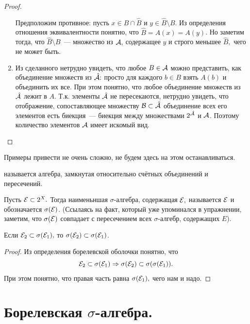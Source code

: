 \documentclass{notes}
\begin{document}
\begin{exc}
\begin{proof}
\begin{enumerate}
				Предположим противное: пусть $x \in B \cap \hat{B}$ и $y \in \hat{B} \setminus B$. Из определения отношения эквивалентности понятно, что $\hat{B} = A(x) = A(y)$. Но заметим тогда, что $\hat{B} \setminus B$~--- множество из $\mathcal{A},$ содержащее $y$ и строго меньшее $\hat{B},$ чего не может быть.
				\item Из сделанного нетрудно увидеть, что любое $B \in \mathcal{A}$ можно представить, как объединение множеств из $\hat{\mathcal{A}}\text{\text{:}}$ просто для каждого $b \in B$ взять $A(b)$ и объединить их все. При этом понятно, что любое объединение множеств из $\hat{\mathcal{A}}$ лежит в $A$. Т.к. элементы $\hat{\mathcal{A}}$ не пересекаются, нетрудно увидеть, что отображение, сопоставляющее множеству $\mathcal{B} \subset \hat{\mathcal{A}}$ объединение всех его элементов есть биекция~--- биекция между множествами $2^{\hat{\mathcal{A}}}$ и $\mathcal{A}$. Поэтому количество элементов $\mathcal{A}$ имеет искомый вид.
			\end{enumerate}
		\end{proof}
	\end{exc}

	Примеры привести не очень сложно, не будем здесь на этом останавливаться.

	\begin{de}
		 называется алгебра, замкнутая относительно счётных объединений и пересечений.
	\end{de}

	\begin{de}
		Пусть $\mathcal{E} \subset 2^X.$ Тогда наименьншая $\sigma$-алгебра, содержащая $\mathcal{E},$ называется  $\mathcal{E}$ и обозначается $\sigma(\mathcal{E})$. (Ссылаясь на факт, который уже упоминался в упражнении, заметим, что $\sigma(\mathcal{E})$ совпадает с пересечением всех $\sigma$-алгебр, содержащих $E$).
	\end{de}

	\begin{lm}
		Если $\mathcal{E}_2 \subset \sigma(\mathcal{E}_1),$ то $\sigma(\mathcal{E}_2) \subset \sigma(\mathcal{E}_1)$.
		\begin{proof}
			Из определения борелевской оболочки понятно, что 
			\[
				\mathcal{E}_2 \subset \sigma(\mathcal{E}_1) \Rightarrow \sigma(\mathcal{E}_2) \subset \sigma(\sigma(\mathcal{E}_1)).
			\]
			При этом понятно, что правая часть равна $\sigma(\mathcal{E}_1),$ чего нам и надо.
		\end{proof}
	\end{lm}

\section{Борелевская \texorpdfstring{$\sigma$}{σ}-алгебра.}
\end{document}
